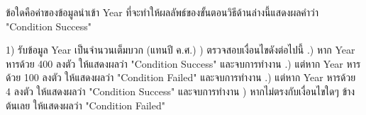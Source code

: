 \question ข้อใดคือค่าของข้อมูลนำเข้า Year ที่จะทำให้ผลลัพธ์ของขั้นตอนวิธีด้านล่างนี้แสดงผลคำว่า "Condition Success"
\newline
\begin{pseudocode}
1) รับข้อมูล Year เป็นจำนวนเต็มบวก (แทนปี ค.ศ.) ) ตรวจสอบเงื่อนไขดังต่อไปนี้
\newline
.) หาก Year หารด้วย 400 ลงตัว ให้แสดงผลว่า "Condition Success" และจบการทำงาน
\newline
.) แต่หาก Year หารด้วย 100 ลงตัว ให้แสดงผลว่า "Condition Failed" และจบการทำงาน
\newline
.) แต่หาก Year หารด้วย 4 ลงตัว ให้แสดงผลว่า "Condition Success" และจบการทำงาน
) หากไม่ตรงกับเงื่อนไขใดๆ ข้างต้นเลย ให้แสดงผลว่า "Condition Failed"
\end{pseudocode}
